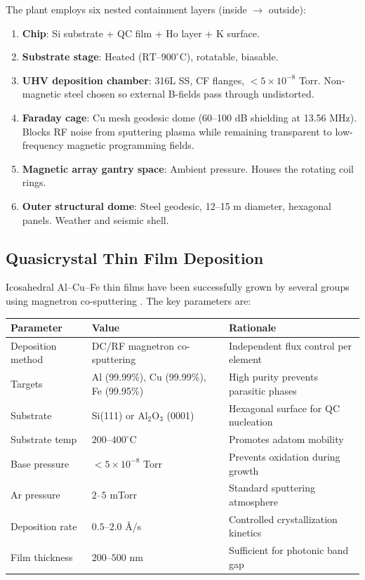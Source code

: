 The plant employs six nested containment layers (inside $\to$ outside):

\begin{enumerate}
    \item \textbf{Chip}: Si substrate + QC film + Ho layer + K surface.
    \item \textbf{Substrate stage}: Heated ($\text{RT}$--$900^\circ$C), rotatable, biasable.
    \item \textbf{UHV deposition chamber}: 316L SS, CF flanges, $< 5 \times 10^{-8}$ Torr. Non-magnetic steel chosen so external B-fields pass through undistorted.
    \item \textbf{Faraday cage}: Cu mesh geodesic dome (60--100 dB shielding at 13.56 MHz). Blocks RF noise from sputtering plasma while remaining transparent to low-frequency magnetic programming fields.
    \item \textbf{Magnetic array gantry space}: Ambient pressure. Houses the rotating coil rings.
    \item \textbf{Outer structural dome}: Steel geodesic, 12--15 m diameter, hexagonal panels. Weather and seismic shell.
\end{enumerate}

\subsection{Quasicrystal Thin Film Deposition}

Icosahedral Al--Cu--Fe thin films have been successfully grown by several groups using magnetron co-sputtering \cite{Shechtman84}. The key parameters are:

\begin{center}
\begin{tabular}{lll}
\toprule
\textbf{Parameter} & \textbf{Value} & \textbf{Rationale} \\
\midrule
Deposition method & DC/RF magnetron co-sputtering & Independent flux control per element \\
Targets & Al (99.99\%), Cu (99.99\%), Fe (99.95\%) & High purity prevents parasitic phases \\
Substrate & Si(111) or Al$_2$O$_3$ (0001) & Hexagonal surface for QC nucleation \\
Substrate temp & $200$--$400^\circ$C & Promotes adatom mobility \\
Base pressure & $< 5 \times 10^{-8}$ Torr & Prevents oxidation during growth \\
Ar pressure & $2$--$5$ mTorr & Standard sputtering atmosphere \\
Deposition rate & $0.5$--$2.0$ \AA/s & Controlled crystallization kinetics \\
Film thickness & $200$--$500$ nm & Sufficient for photonic band gap \\
\bottomrule
\end{tabular}
\end{center}

